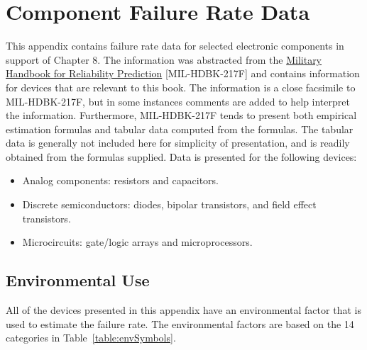 \chapter{Component Failure Rate Data}
\label{appendix:componentFailureRate}
\graphicspath{ {./appendixC/Fig} }

This appendix contains failure rate data for selected electronic
components in support of Chapter 8. The information was abstracted from
the \ul{Military Handbook for Reliability Prediction}
{[}MIL-HDBK-217F{]} and contains information for devices that are
relevant to this book. The information is a close facsimile to
MIL-HDBK-217F, but in some instances comments are added to help
interpret the information. Furthermore, MIL-HDBK-217F tends to present
both empirical estimation formulas and tabular data computed from the
formulas. The tabular data is generally not included here for simplicity
of presentation, and is readily obtained from the formulas supplied.
Data is presented for the following devices:

\begin{itemize}
\item  Analog components: resistors and capacitors.
\item  Discrete semiconductors: diodes, bipolar transistors, and field effect  transistors.
\item  Microcircuits: gate/logic arrays and microprocessors.
\end{itemize}

\section{Environmental Use}
\label{section:environmental-use}

All of the devices presented in this appendix have an environmental
factor that is used to estimate the failure rate. The environmental
factors are based on the 14 categories in Table~\ref{table:envSymbols}.



